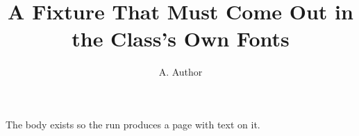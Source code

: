\documentclass[sigconf,nonacm]{acmart}
\begin{document}
\title{A Fixture That Must Come Out in the Class's Own Fonts}
\author{A. Author}
\maketitle
The body exists so the run produces a page with text on it.
\end{document}
